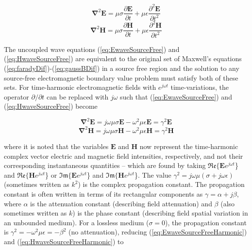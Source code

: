 \begin{equation}\label{eq:EwaveSourceFree}
	\mathbf{\nabla}^2\mathbf{E} = \mu \sigma \frac{\partial \mathbf{E}}{\partial t} + \mu \epsilon \frac{\partial^2 \mathbf{E}}{\partial t^2}
\end{equation}
\begin{equation}\label{eq:HwaveSourceFree}
	\mathbf{\nabla}^2\mathbf{H} = \mu \sigma \frac{\partial \mathbf{H}}{\partial t} + \mu \epsilon \frac{\partial^2 \mathbf{H}}{\partial t^2}
\end{equation}

The uncoupled wave equations (\ref{eq:EwaveSourceFree}) and (\ref{eq:HwaveSourceFree}) are equivalent to the original set of Maxwell's equations (\ref{eq:faradyDif})-(\ref{eq:gaussBDif}) in a source free region and the solution to any source-free electromagnetic boundary value problem must satisfy both of these sets. For time-harmonic electromagnetic fields with $e^{j\omega t}$ time-variations, the operator $\partial/\partial t$ can be replaced with $j\omega$ such that (\ref{eq:EwaveSourceFree}) and (\ref{eq:HwaveSourceFree}) become

\begin{equation}\label{eq:EwaveSourceFreeHarmonic}
	\mathbf{\nabla}^2\mathbf{E} = j\omega \mu \sigma \mathbf{E} - \omega^2 \mu \epsilon \mathbf{E} = \gamma^2\mathbf{E}
\end{equation}
\begin{equation}\label{eq:HwaveSourceFreeHarmonic}
	\mathbf{\nabla}^2\mathbf{H} = j\omega \mu \sigma \mathbf{H} - \omega^2 \mu \epsilon \mathbf{H} = \gamma^2\mathbf{H}
\end{equation}

where it is noted that the variables $\mathbf{E}$ and $\mathbf{H}$ now represent the time-harmonic complex vector electric and magnetic field intensities, respectively, and not their corresponding instantaneous quantities -- which are found by taking $\mathfrak{Re}\{\mathbf{E}e^{j\omega t}$\} and $\mathfrak{Re}\{\mathbf{H}e^{j\omega t}$\} or $\mathfrak{Im}\{\mathbf{E}e^{j\omega t}$\} and $\mathfrak{Im}\{\mathbf{H}e^{j\omega t}$\}. The value $\gamma^2=j\omega \mu(\sigma + j\omega \epsilon)$ (sometimes written as $k^2$) is the complex propagation constant. The propagation constant is often written in terms of its rectangular components as $\gamma=\alpha+j\beta$, where $\alpha$ is the attenuation constant (describing field attenuation) and $\beta$ (also sometimes written as $k$) is the phase constant (describing field spatial variation in an unbounded medium). For a lossless medium ($\sigma=0$), the propagation constant is $\gamma^2=-\omega^2\mu\epsilon=-\beta^2$ (no attenuation), reducing (\ref{eq:EwaveSourceFreeHarmonic}) and (\ref{eq:HwaveSourceFreeHarmonic}) to

